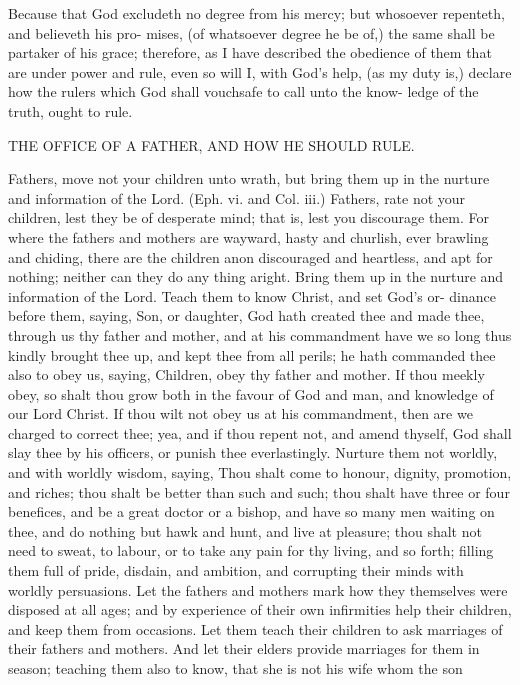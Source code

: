 \documentclass{custom}
\begin{document}
Because that God excludeth no degree from his 
mercy; but whosoever repenteth, and believeth his pro- 
mises, (of whatsoever degree he be of,) the same shall be 
partaker of his grace; therefore, as I have described the 
obedience of them that are under power and rule, even so 
will I, with God's help, (as my duty is,) declare how the 
rulers which God shall vouchsafe to call unto the know- 
ledge of the truth, ought to rule. 


THE OFFICE OF A FATHER, AND HOW HE 
SHOULD RULE. 

Fathers, move not your children unto wrath, but 
bring them up in the nurture and information of the 
Lord. (Eph. vi. and Col. iii.) Fathers, rate not your 
children, lest they be of desperate mind; that is, lest you 
discourage them. For where the fathers and mothers are 
wayward, hasty and churlish, ever brawling and chiding, 
there are the children anon discouraged and heartless, and 
apt for nothing; neither can they do any thing aright. 
Bring them up in the nurture and information of the 
Lord. Teach them to know Christ, and set God's or- 
dinance before them, saying, Son, or daughter, God hath 
created thee and made thee, through us thy father and 
mother, and at his commandment have we so long thus
kindly brought thee up, and kept thee from all perils; he 
hath commanded thee also to obey us, saying, Children,
obey thy father and mother. If thou meekly obey, so 
shalt thou grow both in the favour of God and man, and 
knowledge of our Lord Christ. If thou wilt not obey us 
at his commandment, then are we charged to correct thee;
yea, and if thou repent not, and amend thyself, God shall 
slay thee by his officers, or punish thee everlastingly. 
Nurture them not worldly, and with worldly wisdom, 
saying, Thou shalt come to honour, dignity, promotion, 
and riches; thou shalt be better than such and such; thou 
shalt have three or four benefices, and be a great doctor or 
a bishop, and have so many men waiting on thee, and do 
nothing but hawk and hunt, and live at pleasure; thou 
shalt not need to sweat, to labour, or to take any pain for 
thy living, and so forth; filling them full of pride, disdain,
and ambition, and corrupting their minds with worldly 
persuasions. Let the fathers and mothers mark how they 
themselves were disposed at all ages; and by experience 
of their own infirmities help their children, and keep 
them from occasions. Let them teach their children to 
ask marriages of their fathers and mothers. And let their 
elders provide marriages for them in season; teaching 
them also to know, that she is not his wife whom the son 
\end{document}
